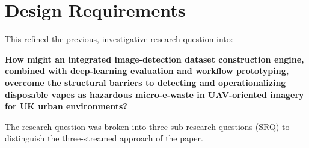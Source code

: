 \section{Design Requirements}

This refined the previous, investigative research question into:
\begin{center}
    \textbf{How might an integrated image-detection dataset construction engine, combined with deep-learning evaluation and workflow prototyping, overcome the structural barriers to detecting and operationalizing disposable vapes as hazardous micro-e-waste in UAV-oriented imagery for UK urban environments?}
\end{center}

The research question was broken into three sub-research questions (SRQ) to distinguish the three-streamed approach of the paper.

